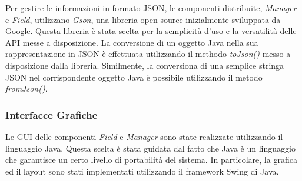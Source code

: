 Per gestire le informazioni in formato JSON, le componenti distribuite, \emph{Manager} e \emph{Field}, utilizzano \emph{Gson}, una libreria open source  inizialmente sviluppata da Google. Questa libreria \`{e} stata scelta per la semplicit\`{a} d'uso e la versatilit\`{a} delle API messe a disposizione. La conversione di un oggetto Java nella sua rappresentazione in JSON \`{e} effettuata utilizzando il methodo \emph{toJson()} messo a disposizione dalla libreria. Similmente, la conversiona di una semplice stringa JSON nel corrispondente oggetto Java \`{e} possibile utilizzando il metodo \emph{fromJson()}. 

\subsubsection{Interfacce Grafiche}
Le GUI delle componenti \emph{Field} e \emph{Manager} sono state realizzate utilizzando il linguaggio Java. Questa scelta \`{e} stata guidata dal fatto che Java \`{e} un linguaggio che garantisce un certo livello di portabilit\`{a} del sistema. In particolare, la grafica ed il layout sono stati implementati utilizzando il framework Swing di Java.